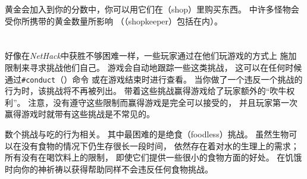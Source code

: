 \documentclass[a4paper, 10pt]{article}
\begin{document}
黄金会加入到你的分数中，你可以用它们在\zhTransShop{}（shop）里购买东西。
\zhTransDungeon{}中许多怪物会受你所携带的黄金数量所影响
（\zhTransShopkeeper{}（shopkeeper）包括在内）。

\section{\zhTransConduct}

好像在{\it NetHack\/}中获胜不够困难一样，一些玩家通过在他们玩游戏的方式上
施加限制来寻求挑战他们自己。
游戏会自动地跟踪一些这类挑战，
这可以在任何时候通过{\tt \#conduct}（\zhTransConduct）命令
或在游戏结束时进行查看。
当你做了一个违反一个挑战的行为时，该挑战将不再被列出。
带着这些挑战赢得游戏给了玩家额外的“吹牛权利”。
注意，没有遵守这些限制而赢得游戏是完全可以接受的，
并且玩家第一次赢得游戏时就带有这些挑战是不常见的。

数个挑战与吃的行为相关。
其中最困难的是绝食（foodless）挑战。
虽然生物可以在没有食物的情况下仍生存很长一段时间，
依然存在着对水的生理上的需求；所有没有在喝饮料上的限制，
即使它们提供一些很小的食物方面的好处。
在饥饿时向你的神祈祷以获得帮助同样不会违反任何食物挑战。
\end{document}
